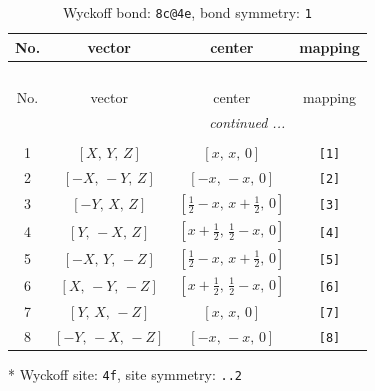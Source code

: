 \documentclass[fleqn,8pt]{jsarticle}
\begin{document}
\renewcommand{\arraystretch}{1.2}
\begin{longtable}{cccc}
\caption{Wyckoff bond: {\tt 8c@4e}, bond symmetry: {\tt 1}}
 \\
 \hline \hline
No. & vector & center & mapping \\ \hline \endfirsthead

\multicolumn{3}{l}{\tablename\ \thetable{}} \\
 \hline \hline
No. & vector & center & mapping \\ \hline \endhead

 \hline \hline
\multicolumn{3}{r}{\footnotesize\it continued ...} \\ \endfoot

 \hline \hline
\multicolumn{3}{r}{} \\ \endlastfoot

1 & $\left[ X,\, Y,\, Z \right]$ & $\left[ x,\, x,\, 0 \right]$ & {\tt [1]} \\ \hline
2 & $\left[ - X,\, - Y,\, Z \right]$ & $\left[ - x,\, - x,\, 0 \right]$ & {\tt [2]} \\ \hline
3 & $\left[ - Y,\, X,\, Z \right]$ & $\left[ \frac{1}{2} - x,\, x + \frac{1}{2},\, 0 \right]$ & {\tt [3]} \\ \hline
4 & $\left[ Y,\, - X,\, Z \right]$ & $\left[ x + \frac{1}{2},\, \frac{1}{2} - x,\, 0 \right]$ & {\tt [4]} \\ \hline
5 & $\left[ - X,\, Y,\, - Z \right]$ & $\left[ \frac{1}{2} - x,\, x + \frac{1}{2},\, 0 \right]$ & {\tt [5]} \\ \hline
6 & $\left[ X,\, - Y,\, - Z \right]$ & $\left[ x + \frac{1}{2},\, \frac{1}{2} - x,\, 0 \right]$ & {\tt [6]} \\ \hline
7 & $\left[ Y,\, X,\, - Z \right]$ & $\left[ x,\, x,\, 0 \right]$ & {\tt [7]} \\ \hline
8 & $\left[ - Y,\, - X,\, - Z \right]$ & $\left[ - x,\, - x,\, 0 \right]$ & {\tt [8]} \\
\end{longtable}
* Wyckoff site: {\tt 4f}, site symmetry: {\tt ..2}
\renewcommand{\arraystretch}{1.2}
\end{document}
